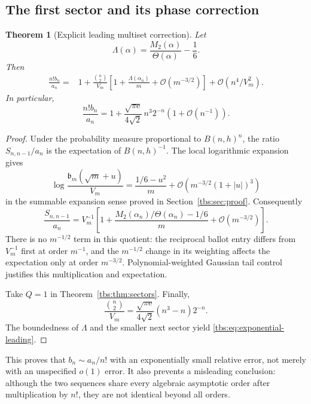\documentclass[11pt,a4paper]{article}
\numberwithin{equation}{section}
\newtheorem{theorem}{Theorem}[section]
\theoremstyle{definition}
\newcommand{\bcont}{\mathfrak b}
\newcommand{\ee}{\mathrm e}
\newcommand{\OO}{\mathcal O}
\begin{document}
\subsection{The first sector and its phase correction}
\begin{theorem}[Explicit leading multiset correction]\label{tbs:thm:first-sector}
Let
\begin{equation}\label{tbs:eq:Lambda}
 \Lambda(\alpha)=\frac{M_2(\alpha)}{\Theta(\alpha)}-\frac16.
\end{equation}
Then
\begin{align}
 \frac{n!b_n}{a_n}
 ={}&1+\frac{\binom n2}{V_m}
       \left[1+\frac{\Lambda(\alpha_n)}m
                    +\OO(m^{-3/2})\right]
       +\OO(n^4/V_m^2).\label{tbs:eq:first-sector}
\end{align}
In particular,
\begin{equation}\label{tbs:eq:exponential-leading}
 \boxed{\displaystyle
 \frac{n!b_n}{a_n}
 =1+\frac{\sqrt{\pi\ee}}{4\sqrt2}\,n^3 2^{-n}
                         \left(1+\OO(n^{-1})\right).}
\end{equation}
\end{theorem}
\begin{proof}
Under the probability measure proportional to $B(n,h)^n$, the ratio
$S_{n,n-1}/a_n$ is the expectation of $B(n,h)^{-1}$.
The local logarithmic expansion gives
\[
 \log\frac{\bcont_m(\sqrt m+u)}{V_m}
 =\frac{1/6-u^2}{m}+\OO\!\left(m^{-3/2}(1+|u|)^3\right)
\]
in the summable expansion sense proved in Section~\ref{tbs:sec:proof}.
Consequently
\[
 \frac{S_{n,n-1}}{a_n}
 =V_m^{-1}\left[1+
   \frac{M_2(\alpha_n)/\Theta(\alpha_n)-1/6}{m}
   +\OO(m^{-3/2})\right].
\]
There is no $m^{-1/2}$ term in this quotient: the reciprocal ballot
entry differs from $V_m^{-1}$ first at order $m^{-1}$, and the
$m^{-1/2}$ change in its weighting affects the expectation only at
order $m^{-3/2}$. Polynomial-weighted Gaussian tail control justifies
this multiplication and expectation.

Take $Q=1$ in Theorem~\ref{tbs:thm:sectors}. Finally,
\[
 \frac{\binom n2}{V_m}
 =\frac{\sqrt{\pi\ee}}{4\sqrt2}(n^3-n)2^{-n}.
\]
The boundedness of $\Lambda$ and the smaller next sector yield
\eqref{tbs:eq:exponential-leading}.
\end{proof}

This proves that $b_n\sim a_n/n!$ with an exponentially small relative
error, not merely with an unspecified $o(1)$ error. It also prevents a
misleading conclusion: although the two sequences share every algebraic
asymptotic order after multiplication by $n!$, they are not identical
beyond all orders.
\end{document}
